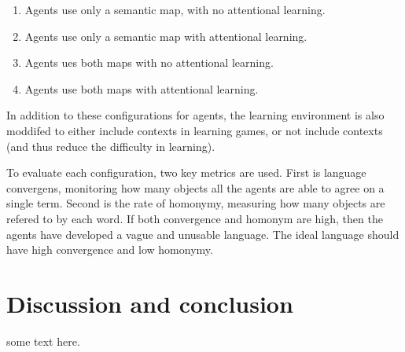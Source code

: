 \documentclass[a4paper,11pt]{article}
\begin{document}
{\small
\begin{enumerate}

\item Agents use only a semantic map, with no attentional learning.

\item Agents use only a semantic map with attentional learning.

\item Agents ues both maps with no attentional learning.

\item Agents use both maps with attentional learning.

\end{enumerate}
}

In addition to these configurations for agents, the learning environment is
also moddifed to either include contexts in learning games, or not include
contexts (and thus reduce the difficulty in learning).

To evaluate each configuration, two key metrics are used.  First is language
convergens, monitoring how many objects all the agents are able to agree on a
single term.  Second is the rate of homonymy, measuring how many objects are
refered to by each word.  If both convergence and homonym are high, then the
agents have developed a vague and unusable language.  The ideal language should
have high convergence and low homonymy.  


\section{Discussion and conclusion}
some text here.   
\end{document}
